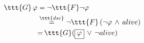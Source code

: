 \documentclass[11pt]{article}
\begin{document}
$\begin{aligned}
     \ttt{G}\,\varphi &= \neg \ttt{F}\neg \varphi \\
     &\overset{\ttt{dsc}}{=} \neg \ttt{F}\,(\neg\varphi\,\land\,alive) \\
     &{=}\, \ttt{G}(\boxed{\varphi}\,\lor\,\neg alive)
\end{aligned}$
\end{document}
